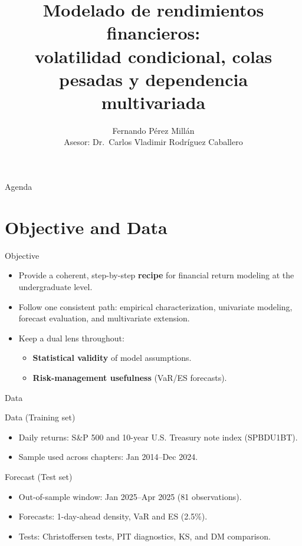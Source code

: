 \documentclass[aspectratio=169,11pt]{beamer}
\title[Thesis]{Modelado de rendimientos financieros:\\volatilidad condicional, colas pesadas y dependencia multivariada}
\author[F. P\'erez Mill\'an]{Fernando P\'erez Mill\'an\\[0.5em]\small Asesor: Dr.~Carlos Vladimir Rodr\'iguez Caballero}
\institute[]{Instituto Tecnol\'ogico Aut\'onomo de M\'exico}
\date{}
\begin{document}
\begin{frame}[plain]
\titlepage
\end{frame}

\begin{frame}{Agenda}
\tableofcontents[sections={1-7}]
\end{frame}

\section{Objective and Data}
\begin{frame}{Objective}
\begin{itemize}\setlength{\itemsep}{1em}
\item Provide a coherent, step-by-step \textbf{recipe} for financial return modeling at the undergraduate level.
\item Follow one consistent path: empirical characterization, univariate modeling, forecast evaluation, and multivariate extension.
\item Keep a dual lens throughout:
\begin{itemize}
\item \textbf{Statistical validity} of model assumptions.
\item \textbf{Risk-management usefulness} (VaR/ES forecasts).
\end{itemize}
\end{itemize}
\end{frame}

\begin{frame}{Data}
\begin{block}{Data (Training set)}
\begin{itemize}
\item Daily returns: S\&P 500 and 10-year U.S. Treasury note index (SPBDU1BT).
\item Sample used across chapters: Jan 2014--Dec 2024.
\end{itemize}
\end{block}
\vspace{1.5em}
\begin{block}{Forecast (Test set)}
\begin{itemize}
\item Out-of-sample window: Jan 2025--Apr 2025 (81 observations).
\item Forecasts: 1-day-ahead density, VaR and ES (2.5\%).
\item Tests: Christoffersen tests, PIT diagnostics, KS, and DM comparison.
\end{itemize}
\end{block}
\end{frame}
\end{document}

